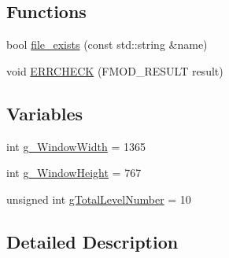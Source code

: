 \subsection*{Functions}
\begin{DoxyCompactItemize}
\item 
bool \hyperlink{namespace_symp_ad9d71726b066a1c06e6a7b5fb2cc2f7d}{file\-\_\-exists} (const std\-::string \&name)
\item 
void \hyperlink{namespace_symp_a66a3b4379506cc3ff4dc907ded655843}{E\-R\-R\-C\-H\-E\-C\-K} (F\-M\-O\-D\-\_\-\-R\-E\-S\-U\-L\-T result)
\end{DoxyCompactItemize}
\subsection*{Variables}
\begin{DoxyCompactItemize}
\item 
int \hyperlink{namespace_symp_a13b9ebf55d22fb1ad248558acfd4cec6}{g\-\_\-\-Window\-Width} = 1365
\item 
int \hyperlink{namespace_symp_a09ae4e5593b8a85ecf79b0db00377f1f}{g\-\_\-\-Window\-Height} = 767
\item 
unsigned int \hyperlink{namespace_symp_a350b1cbffd0ded84bd0f5bb28bf9abe4}{g\-Total\-Level\-Number} = 10
\end{DoxyCompactItemize}


\subsection{Detailed Description}


